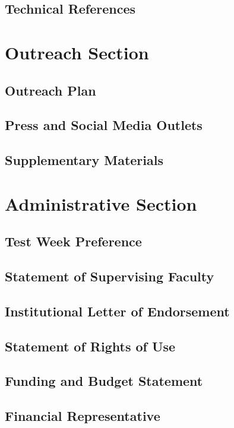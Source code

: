 \documentclass{article}
\begin{document}
\subsection{Technical References}


\section{Outreach Section}
\subsection{Outreach Plan}
\subsection{Press and Social Media Outlets}
\subsection{Supplementary Materials}


\section{Administrative Section}
\subsection{Test Week Preference}
\subsection{Statement of Supervising Faculty}
\subsection{Institutional Letter of Endorsement}
\subsection{Statement of Rights of Use}
\subsection{Funding and Budget Statement}
\subsection{Financial Representative}
\end{document}
